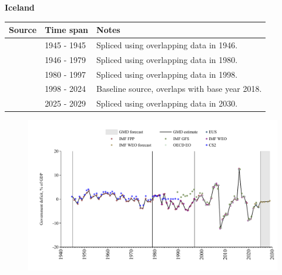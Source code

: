 \documentclass[12pt,a4paper,landscape]{article}
\begin{document}
\begin{adjustbox}{max totalsize={\paperwidth}{\paperheight},center}
\begin{minipage}[t][\textheight][t]{\textwidth}
\vspace*{0.5cm}
{}
\begin{center}
{\Large\bfseries Iceland}
\end{center}
\vspace{0.5cm}
\begin{table}[H]
\centering
\small
\begin{tabular}{|l|l|l|}
\hline
\textbf{Source} & \textbf{Time span} & \textbf{Notes} \\
\hline
\rowcolor{white}\cite{CS2_ISL}& 1945 - 1945 &Spliced using overlapping data in 1946.\\
\rowcolor{lightgray}\cite{IMF_FPP}& 1946 - 1979 &Spliced using overlapping data in 1980.\\
\rowcolor{white}\cite{IMF_WEO}& 1980 - 1997 &Spliced using overlapping data in 1998.\\
\rowcolor{lightgray}\cite{EUS}& 1998 - 2024 &Baseline source, overlaps with base year 2018.\\
\rowcolor{white}\cite{IMF_WEO_forecast}& 2025 - 2029 &Spliced using overlapping data in 2030.\\
\hline
\end{tabular}
\end{table}
\begin{figure}[H]
\centering
\includegraphics[width=\textwidth,height=0.6\textheight,keepaspectratio]{graphs/ISL_govdef_GDP.pdf}
\end{figure}
\end{minipage}
\end{adjustbox}
\end{document}
